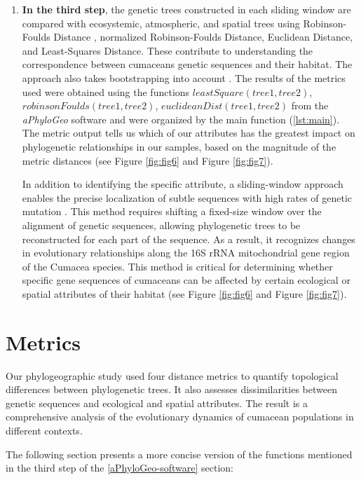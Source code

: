\begin{enumerate}
\item \textbf{In the third step}, the genetic trees constructed in each sliding window are compared with ecosystemic, atmospheric, and spatial trees using Robinson-Foulds Distance \citep{robinson_comparison_1981, koshkarov_phylogeography_2022}, normalized Robinson-Foulds Distance, Euclidean Distance, and Least-Squares Distance. These contribute to understanding the correspondence between cumaceans genetic sequences and their habitat. The approach also takes bootstrapping into account \citep{koshkarov_phylogeography_2022}. The results of the metrics used were obtained using the functions $leastSquare(tree1, tree2)$, $robinsonFoulds(tree1, tree2)$, $euclideanDist(tree1, tree2)$ from the \textit{aPhyloGeo} software and were organized by the main function (\autoref{lst:main}). The metric output tells us which of our attributes has the greatest impact on phylogenetic relationships in our samples, based on the magnitude of the metric distances (see Figure \ref{fig:fig6} and Figure \ref{fig:fig7}). 

In addition to identifying the specific attribute, a sliding-window approach enables the precise localization of subtle sequences with high rates of genetic mutation \citep{koshkarov_phylogeography_2022}. This method requires shifting a fixed-size window over the alignment of genetic sequences, allowing phylogenetic trees to be reconstructed for each part of the sequence. As a result, it recognizes changes in evolutionary relationships along the 16S rRNA mitochondrial gene region of the Cumacea species. This method is critical for determining whether specific gene sequences of cumaceans can be affected by certain ecological or spatial attributes of their habitat (see Figure \ref{fig:fig6} and Figure \ref{fig:fig7}).
\end{enumerate}

\section{Metrics}\label{metrics}
Our phylogeographic study used four distance metrics to quantify topological differences between phylogenetic trees. It also assesses dissimilarities between genetic sequences and ecological and spatial attributes. The result is a comprehensive analysis of the evolutionary dynamics of cumacean populations in different contexts. 

The following section presents a more concise version of the functions mentioned in the third step of the \autoref{aPhyloGeo-software} section:

